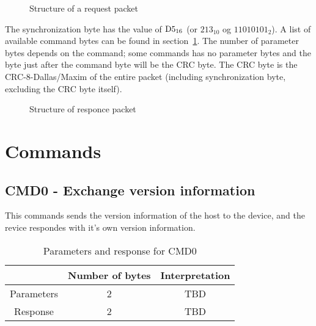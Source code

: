 \documentclass[11pt,a4paper,oneside]{memoir}
\begin{document}
\begin{figure}[htbp]
  \centering
  \vspace{2cm}
  \caption{Structure of a request packet}
  \label{fig:request-packet}
\end{figure}

The synchronization byte has the value of $\textup{D}5_{16}$ (or
$213_{10}$ og $11010101_2$). A list of available command bytes can be
found in section~\ref{sc:commands}. The number of parameter bytes
depends on the command; some commands has no parameter bytes and the
byte just after the command byte will be the CRC byte. The CRC byte is
the CRC-8-Dallas/Maxim of the entire packet (including synchronization
byte, excluding the CRC byte itself).


\begin{figure}[htbp]
  \centering
  \vspace{2cm}
  \caption{Structure of responce packet}
  \label{fig:response-packet}
\end{figure}


\section{Commands}
\label{sc:commands}

\subsection{CMD0 - Exchange version information}

This commands sends the version information of the host to the device,
and the revice respondes with it's own version information.

\begin{table}[htbp]
  \centering
  \begin{tabular}{ccc}
    \toprule
    & \textbf{Number of bytes} & \textbf{Interpretation} \\
    \midrule
    Parameters & 2 & TBD \\
    Response & 2 & TBD \\
    \bottomrule
  \end{tabular}
  \caption{Parameters and response for CMD0}
  \label{tab:cmd0}
\end{table}
\end{document}
